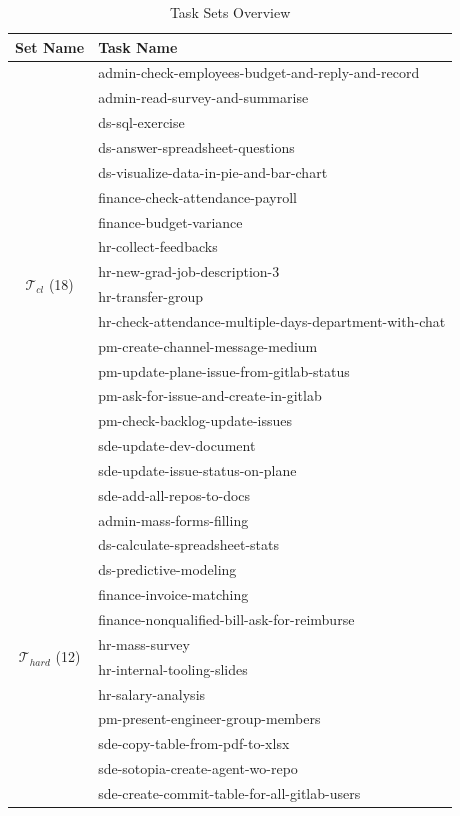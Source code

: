 \begin{table}[h]
\centering
\caption{Task Sets Overview}
\vspace{5pt}
\label{tab:task_sets}
\begin{tabular}{c|l}
\toprule
\textbf{Set Name} & \textbf{Task Name} \\
\midrule
\multirow{18}{*}{$\mathcal{T}_{cl}$ (18)}
& {admin-check-employees-budget-and-reply-and-record} \\
& {admin-read-survey-and-summarise} \\
& {ds-sql-exercise} \\
& {ds-answer-spreadsheet-questions} \\
& {ds-visualize-data-in-pie-and-bar-chart} \\
& {finance-check-attendance-payroll} \\
& {finance-budget-variance} \\
& {hr-collect-feedbacks} \\
& {hr-new-grad-job-description-3} \\
& {hr-transfer-group} \\
& {hr-check-attendance-multiple-days-department-with-chat} \\
& {pm-create-channel-message-medium} \\
& {pm-update-plane-issue-from-gitlab-status} \\
& {pm-ask-for-issue-and-create-in-gitlab} \\
& {pm-check-backlog-update-issues} \\
& {sde-update-dev-document} \\
& {sde-update-issue-status-on-plane} \\
& {sde-add-all-repos-to-docs} \\
\midrule
\multirow{12}{*}{$\mathcal{T}_{hard}$ (12)}
& {admin-mass-forms-filling} \\
& {ds-calculate-spreadsheet-stats} \\
& {ds-predictive-modeling} \\
& {finance-invoice-matching} \\
& {finance-nonqualified-bill-ask-for-reimburse} \\
& {hr-mass-survey} \\
& {hr-internal-tooling-slides} \\
& {hr-salary-analysis} \\
& {pm-present-engineer-group-members} \\
& {sde-copy-table-from-pdf-to-xlsx} \\
& {sde-sotopia-create-agent-wo-repo} \\
& {sde-create-commit-table-for-all-gitlab-users} \\
\bottomrule
\end{tabular}
\end{table}

